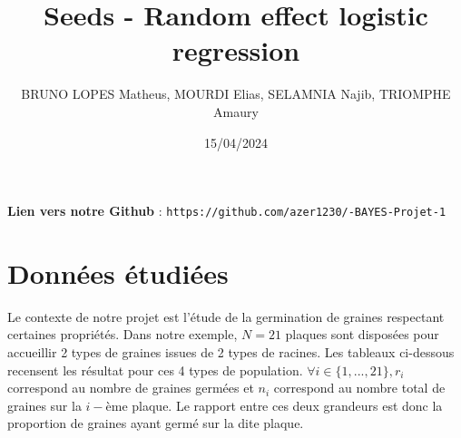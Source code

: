 \documentclass[
]{article}
\title{Seeds - Random effect logistic regression}
\author{BRUNO LOPES Matheus, MOURDI Elias, SELAMNIA Najib, TRIOMPHE
Amaury}
\date{15/04/2024}
\begin{document}
\maketitle

\textbf{Lien vers notre Github} :
\texttt{https://github.com/azer1230/-BAYES-Projet-1}

\hypertarget{donnuxe9es-uxe9tudiuxe9es}{%
\section{Données étudiées}\label{donnuxe9es-uxe9tudiuxe9es}}

Le contexte de notre projet est l'étude de la germination de graines
respectant certaines propriétés. Dans notre exemple, \(N = 21\) plaques
sont disposées pour accueillir 2 types de graines issues de 2 types de
racines. Les tableaux ci-dessous recensent les résultat pour ces 4 types
de population. \(\forall i \in \{1,...,21\}, r_i\) correspond au nombre
de graines germées et \(n_i\) correspond au nombre total de graines sur
la \(i-\)ème plaque. Le rapport entre ces deux grandeurs est donc la
proportion de graines ayant germé sur la dite plaque.
\end{document}
